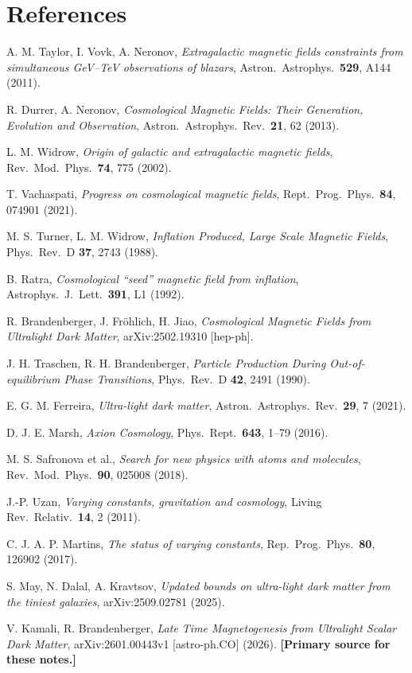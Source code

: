 \documentclass[12pt,a4paper,openany]{book}
\begin{document}
\chapter*{References}
\begin{enumerate}[label={[\arabic*]}]
  \item A. M. Taylor, I. Vovk, A. Neronov, \textit{Extragalactic magnetic fields constraints from simultaneous GeV--TeV observations of blazars}, Astron.\ Astrophys.\ \textbf{529}, A144 (2011).
  \item R. Durrer, A. Neronov, \textit{Cosmological Magnetic Fields: Their Generation, Evolution and Observation}, Astron.\ Astrophys.\ Rev.\ \textbf{21}, 62 (2013).
  \item L. M. Widrow, \textit{Origin of galactic and extragalactic magnetic fields}, Rev.\ Mod.\ Phys.\ \textbf{74}, 775 (2002).
  \item T. Vachaspati, \textit{Progress on cosmological magnetic fields}, Rept.\ Prog.\ Phys.\ \textbf{84}, 074901 (2021).
  \item M. S. Turner, L. M. Widrow, \textit{Inflation Produced, Large Scale Magnetic Fields}, Phys.\ Rev.\ D \textbf{37}, 2743 (1988).
  \item B. Ratra, \textit{Cosmological ``seed'' magnetic field from inflation}, Astrophys.\ J.\ Lett.\ \textbf{391}, L1 (1992).
  \item[12.] R. Brandenberger, J. Fr\"{o}hlich, H. Jiao, \textit{Cosmological Magnetic Fields from Ultralight Dark Matter}, arXiv:2502.19310 [hep-ph].
  \item[13.] J. H. Traschen, R. H. Brandenberger, \textit{Particle Production During Out-of-equilibrium Phase Transitions}, Phys.\ Rev.\ D \textbf{42}, 2491 (1990).
  \item[17.] E. G. M. Ferreira, \textit{Ultra-light dark matter}, Astron.\ Astrophys.\ Rev.\ \textbf{29}, 7 (2021).
  \item[19.] D. J. E. Marsh, \textit{Axion Cosmology}, Phys.\ Rept.\ \textbf{643}, 1--79 (2016).
  \item[21.] M. S. Safronova et al., \textit{Search for new physics with atoms and molecules}, Rev.\ Mod.\ Phys.\ \textbf{90}, 025008 (2018).
  \item[22.] J.-P. Uzan, \textit{Varying constants, gravitation and cosmology}, Living Rev.\ Relativ.\ \textbf{14}, 2 (2011).
  \item[23.] C. J. A. P. Martins, \textit{The status of varying constants}, Rep.\ Prog.\ Phys.\ \textbf{80}, 126902 (2017).
  \item[24.] S. May, N. Dalal, A. Kravtsov, \textit{Updated bounds on ultra-light dark matter from the tiniest galaxies}, arXiv:2509.02781 (2025).
  \item[---] V. Kamali, R. Brandenberger, \textit{Late Time Magnetogenesis from Ultralight Scalar Dark Matter}, arXiv:2601.00443v1 [astro-ph.CO] (2026). \textbf{[Primary source for these notes.]}
\end{enumerate}
\end{document}
